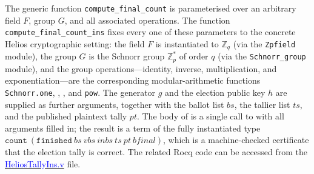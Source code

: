 \documentclass[sigconf,anonymous,review]{acmart}
\begin{document}
The generic function \texttt{compute\_final\_count} is parameterised over an
arbitrary field $F$, group $G$, and all associated operations.
The function \texttt{compute\_final\_count\_ins} fixes every one of these
parameters to the concrete Helios cryptographic setting: the field $F$ is
instantiated to $\mathbb{Z}_q$ (via the \texttt{Zpfield} module), the group
$G$ is the Schnorr group $\mathbb{Z}^*_p$ of order $q$ (via the
\texttt{Schnorr\_group} module), and the group operations---identity,
inverse, multiplication, and exponentiation---are the corresponding
modular-arithmetic functions \texttt{Schnorr.one}, \texttt{},
\texttt{}, and \texttt{pow}.
The generator $g$ and the election public key $h$
are supplied as further arguments, together with the ballot list $\mathit{bs}$,
the tallier list $\mathit{ts}$, and the published plaintext tally
$\mathit{pt}$.
The body of \texttt{} is a single call to
\texttt{} with all arguments filled in; the result is a
term of the fully instantiated type
$\texttt{count}~(\texttt{finished}~\mathit{bs}~\mathit{vbs}~\mathit{inbs}~\mathit{ts}~\mathit{pt}~\mathit{bfinal})$,
which is a machine-checked certificate that the election tally is correct. The related Rocq code can be accessed from  the 
\href{https://anonymous.4open.science/r/SigmaProtocol-EBA5/src/Examples/HeliosTallyIns.v}{\textcolor{blue}{HeliosTallyIns.v}} file.
\end{document}
